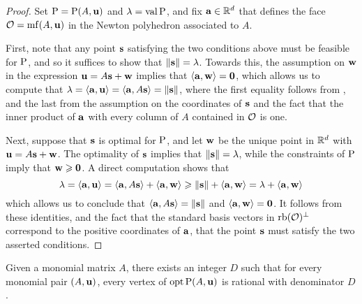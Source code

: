 \documentclass[11pt]{amsart}
\renewcommand{\!}[1]{{\color{red}\text{$\star$\,}#1\,$\star$}}
\begin{document}
\begin{proof}  
Set $\mathrm{P} = \mathrm{P}(A, \mathbf{u})$ and $\lambda = \operatorname{val} \mathrm{P}$, and fix $\mathbf{a} \in \mathbb{R}^d$ that defines the face $\mathcal{O} = \operatorname{mf}(A, \mathbf{u})$ in the Newton polyhedron associated to $A$. 

First, note that any point $\mathbf{s}$ satisfying the two conditions above must be feasible for $\mathrm{P}$, and so it suffices to show that $\| \mathbf{s} \| = \lambda$.  Towards this, the assumption on $\mathbf{w}$ in the expression $\mathbf{u} = A \mathbf{s} + \mathbf{w}$ implies that $\langle \mathbf{a}, \mathbf{w} \rangle = \mathbf{0}$, which allows us to compute that $\lambda = \langle \mathbf{a}, \mathbf{u} \rangle = \langle \mathbf{a}, A\mathbf{s} \rangle = \| \mathbf{s} \|$, where the first equality follows from 
, and the last from the assumption on the coordinates of $\mathbf{s}$ and the fact that the inner product of $\mathbf{a}$ with every column of $A$ contained in $\mathcal{O}$ is one.

Next, suppose that $\mathbf{s}$ is optimal for $\mathrm{P}$, and let $\mathbf{w}$ be the unique point in $\mathbb{R}^d$ with $\mathbf{u} = A \mathbf{s} + \mathbf{w}$.  The optimality of $\mathbf{s}$ implies that $\| \mathbf{s} \| = \lambda$, while the constraints of $\mathrm{P}$ imply that $\mathbf{w} \geqslant \mathbf{0}$.  A direct computation shows that
%
\[ \lambda = \langle \mathbf{a}, \mathbf{u} \rangle = \langle \mathbf{a}, A \mathbf{s} \rangle + \langle \mathbf{a}, \mathbf{w} \rangle \geqslant \| \mathbf{s} \| + \langle \mathbf{a}, \mathbf{w} \rangle = \lambda + \langle \mathbf{a}, \mathbf{w} \rangle \]
%
which allows us to conclude that $\langle \mathbf{a}, A \mathbf{s} \rangle = \| \mathbf{s} \|$ and $\langle \mathbf{a}, \mathbf{w} \rangle = \mathbf{0}$.  It follows from these identities, and the fact that the standard basis vectors in $\operatorname{rb}(\mathcal{O})^{\perp}$ correspond to the positive coordinates of $\mathbf{a}$, that the point $\mathbf{s}$ must satisfy the two asserted conditions.
\end{proof}



\begin{theorem}  
\label{uniform denominators for vertices:  T}
Given a monomial matrix $A$, there exists an integer $D$ such that for every monomial pair $(A, \mathbf{u})$, every vertex of $\operatorname{opt} \mathrm{P}(A, \mathbf{u})$ is rational with denominator $D$.
\end{theorem}
\end{document}
